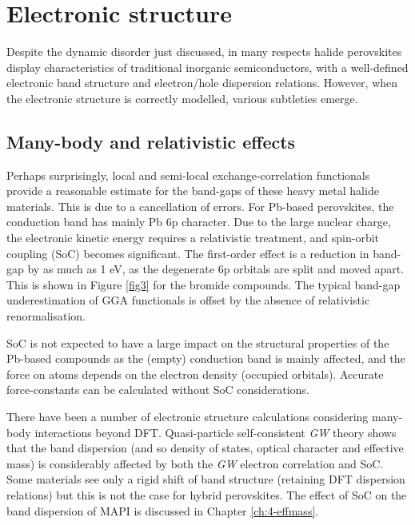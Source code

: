 \section{Electronic structure}

Despite the dynamic disorder just discussed, in many respects halide perovskites display characteristics of traditional inorganic semiconductors, with a well-defined electronic band structure and electron/hole dispersion relations.
However, when the electronic structure is correctly modelled, various subtleties emerge. 

\subsection{Many-body and relativistic effects} \label{Mbre}

Perhaps surprisingly, local and semi-local exchange-correlation functionals 
provide a reasonable estimate for the band-gaps of these heavy metal halide materials.
This is due to a cancellation of errors. 
For Pb-based perovskites, the conduction band has mainly Pb 6p character. 
Due to the large nuclear charge, the electronic kinetic energy requires a relativistic
treatment, and spin-orbit coupling (SoC) becomes significant. 
The first-order effect is a reduction in band-gap by as much as 1 eV\autocite{Brivio2014a}, as the degenerate 6p orbitals are split and moved apart. 
This is shown in Figure \ref{fig3} for the bromide compounds.
The typical band-gap underestimation of GGA functionals is offset by the absence of relativistic renormalisation.

SoC is not expected to have a large impact on the structural properties of the Pb-based compounds as the (empty) conduction band is mainly affected, and the force on atoms depends on the electron density (occupied orbitals). 
Accurate force-constants can be calculated without SoC considerations.\autocite{PerezOsorio2015a}

There have been a number of electronic structure calculations considering many-body interactions beyond DFT. 
Quasi-particle self-consistent \textit{GW} theory shows that the band dispersion (and so density of states, optical character and effective mass) is considerably affected by both the \textit{GW} electron correlation and SoC.\autocite{Brivio2014a}
Some materials see only a rigid shift of band structure (retaining DFT dispersion relations)\autocite{VanSchilfgaarde2006,Butler2016} but this is not the case for hybrid perovskites.
The effect of SoC on the band dispersion of MAPI is discussed in Chapter \ref{ch:4-effmass}.

